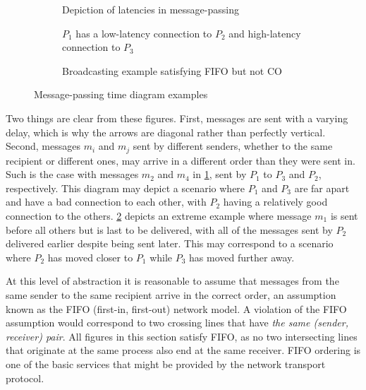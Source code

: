 \documentclass[]             %
{NASA}                       %
\theoremstyle{definition}
\begin{document}
\begin{figure}[p]
  \setlength\belowcaptionskip{5ex}

  \begin{subfigure}{1\textwidth}
    \centering
    
    \caption{Depiction of latencies in message-passing}
    \label{fig:message-latencies-a}
  \end{subfigure}

  \begin{subfigure}{1\textwidth}
    \centering 
    \caption{$P_1$ has a low-latency connection to $P_2$ and high-latency connection to $P_3$}
    \label{fig:message-latencies-b}
  \end{subfigure}


  \begin{subfigure}{1\textwidth}
    \centering 
    \caption{Broadcasting example satisfying FIFO but not CO}
    \label{fig:message-latencies-c}
  \end{subfigure}

  \caption{Message-passing time diagram examples}
  \label{fig:message-latencies}
\end{figure}

\afterpage{\clearpage}

Two things are clear from these figures. First, messages are sent with
a varying delay, which is why the arrows are diagonal rather than
perfectly vertical. Second, messages $m_i$ and $m_j$ sent by different
senders, whether to the same recipient or different ones, may arrive
in a different order than they were sent in. Such is the case with
messages $m_2$ and $m_4$ in \ref{fig:message-latencies-a}, sent by
$P_1$ to $P_3$ and $P_2$, respectively. This diagram may depict a
scenario where $P_1$ and $P_3$ are far apart and have a bad connection
to each other, with $P_2$ having a relatively good connection to the
others. \ref{fig:message-latencies-b} depicts an extreme example where
message $m_1$ is sent before all others but is last to be delivered,
with all of the messages sent by $P_2$ delivered earlier despite being
sent later. This may correspond to a scenario where $P_2$ has moved
closer to $P_1$ while $P_3$ has moved further away.

At this level of abstraction it is reasonable to assume that messages
from the same sender to the same recipient arrive in the correct
order, an assumption known as the FIFO (first-in, first-out) network
model. A violation of the FIFO assumption would correspond to two
crossing lines that have \emph{the same (sender, receiver) pair}. All
figures in this section satisfy FIFO, as no two intersecting lines
that originate at the same process also end at the same receiver. FIFO
ordering is one of the basic services that might be provided by the
network transport protocol.
\end{document}
